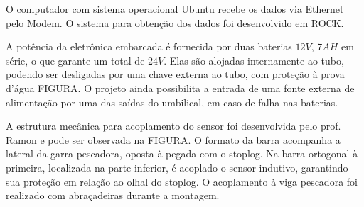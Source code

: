 O computador com sistema operacional Ubuntu recebe os dados via Ethernet pelo
Modem. O sistema para obtenção dos dados foi desenvolvido em ROCK.

A potência da eletrônica embarcada é fornecida por duas baterias $12V$, $7AH$ em
série, o que garante um total de $24V$. Elas são alojadas internamente ao tubo,
podendo ser desligadas por uma chave externa ao tubo, com proteção à prova
d'água FIGURA. O projeto ainda possibilita a entrada de uma fonte externa de
alimentação por uma das saídas do umbilical, em caso de falha nas baterias.

A estrutura mecânica para acoplamento do sensor foi desenvolvida pelo prof.
Ramon e pode ser observada na FIGURA. O formato da barra acompanha a lateral
da garra pescadora, oposta à pegada com o stoplog. Na barra ortogonal à
primeira, localizada na parte inferior, é acoplado o sensor indutivo, garantindo
sua proteção em relação ao olhal do stoplog. O acoplamento à viga pescadora foi
realizado com abraçadeiras durante a montagem.




\label{materials}




